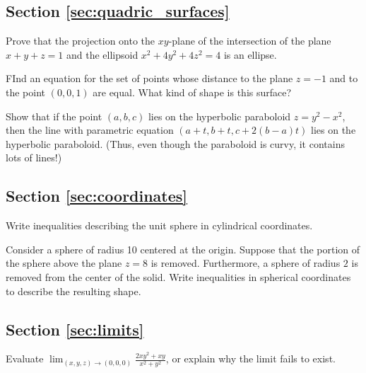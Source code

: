 \documentclass[svgnames]{watsonbook}
\begin{document}
\subsection*{Section \ref{sec:quadric_surfaces}}

\begin{exercise}{}{} Prove that the projection onto the
$xy$-plane of the intersection of the plane $x+y+z = 1$ and the ellipsoid
$x^2 + 4y^2 + 4z^2 = 4$ is an ellipse.
\end{exercise}

\begin{exercise}{}{}
FInd an equation for the set of points whose distance to the plane $z
= -1$ and to the point $(0,0,1)$ are equal. What kind of shape is this surface?
\end{exercise}

\begin{exercise}{}{}
Show that if the point $(a,b,c)$ lies on the hyperbolic
paraboloid $z = y^2 - x^2$, then the line with parametric equation
$(a+t,b+t,c + 2(b-a)t)$ lies on the hyperbolic paraboloid. (Thus, even
though the paraboloid is curvy, it contains lots of lines!)
\end{exercise}

\subsection*{Section \ref{sec:coordinates}}

\begin{exercise}{}{}
  Write inequalities describing the unit sphere in cylindrical
  coordinates.
\end{exercise}

\begin{exercise}{}{}
  Consider a sphere of radius 10 centered at the origin. Suppose that
  the portion of the sphere above the plane $z=8$ is
  removed. Furthermore, a sphere of radius $2$ is removed from the
  center of the solid. Write inequalities in spherical coordinates to
  describe the resulting shape.
\end{exercise}

\subsection*{Section \ref{sec:limits}}

\begin{exercise}{}{}
  Evaluate 
  $\lim_{(x,y,z)\to(0,0,0)}\frac{2xy^2+xy}{x^2+y^2}$, or explain why
  the limit fails to exist.
\end{exercise}
\end{document}
